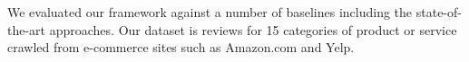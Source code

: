 \documentclass[10pt,final,conference,letterpaper]{IEEEtran}
\newcommand{\tabref}[1]{Table \ref{#1}}
\begin{document}
We evaluated our framework
against a number of baselines including the state-of-the-art approaches.
Our dataset is reviews for 15 categories of product or service crawled from
e-commerce sites such as Amazon.com and Yelp. 
%
%
%
\end{document}
